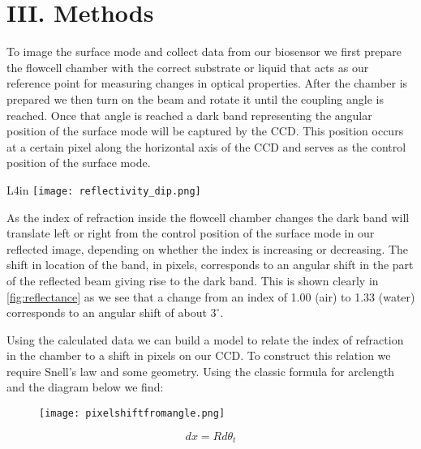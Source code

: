 \section*{III. Methods}
\hspace{0.25in}
To image the surface mode and collect data from our biosensor we first prepare the flowcell chamber with the correct substrate or liquid that acts as our reference point for measuring changes in optical properties. After the chamber is prepared we then turn on the beam and rotate it until the coupling angle is reached. Once that angle is reached a dark band representing the angular position of the surface mode will be captured by the CCD. This position occurs at a certain pixel along the horizontal axis of the CCD and serves as the control position of the surface mode.

\begin{wrapfigure}{L}{4in}
	\texttt{[image: reflectivity\_dip.png]}
	\caption{The reflectance characteristic of our multilayer. This plot was developed using a transfer matrix method.}
	\label{fig:reflectance}
\end{wrapfigure}

As the index of refraction inside the flowcell chamber changes the dark band will translate left or right from the control position of the surface mode in our reflected image, depending on whether the index is increasing or decreasing. The shift in location of the band, in pixels, corresponds to an angular shift in the part of the reflected beam giving rise to the dark band. This is shown clearly in \ref{fig:reflectance} as we see that a change from an index of 1.00 (air) to 1.33 (water) corresponds to an angular shift  of about $3^\circ$.


Using the calculated data we can build a model to relate the index of refraction in the chamber to a shift in pixels on our CCD. To construct this relation we require Snell's law and some geometry. Using the classic formula for arclength and the diagram below we find:\\

\begin{figure}[h!]
\begin{center}
\texttt{[image: pixelshiftfromangle.png]}
\end{center}
\end{figure}

\begin{equation*}
	dx = R d\theta_t
\end{equation*}

